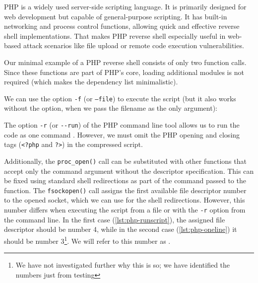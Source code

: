 
PHP is a widely used server-side scripting language. It is primarily designed for web development but capable of general-purpose scripting. It has built-in networking and process control functions, allowing quick and effective reverse shell implementations. That makes PHP reverse shell especially useful in web-based attack scenarios like file upload or remote code execution vulnerabilities.

Our minimal example of a PHP reverse shell consists of only two function calls. Since these functions are part of PHP's core, loading additional modules is not required (which makes the dependency list minimalistic).




We can use the option \texttt{-f} (or \texttt{--file}) to execute the script (but it also works without the option, when we pass the filename as the only argument):


The option \texttt{-r} (or \texttt{-{}-run}) of the PHP command line tool allows us to run the code as one command \cite{php-man}. However, we must omit the PHP opening and closing tags (\texttt{<?php} and \texttt{?>}) in the compressed script.


Additionally, the \texttt{proc\_open()} call can be substituted with other functions that accept only the command argument without the descriptor specification. This can be fixed using standard shell redirections as part of the command passed to the function. The \texttt{fsockopen()} call assigns the first available file descriptor number to the opened socket, which we can use for the shell redirections. However, this number differs when executing the script from a file or with the \texttt{-r} option from the command line. In the first case (\cref{lst:php-runscript}), the assigned file descriptor should be number 4, while in the second case (\cref{lst:php-oneline}) it should be number 3\footnote{We have not investigated further why this is so; we have identified the numbers just from testing}. We will refer to this number as \fd.

